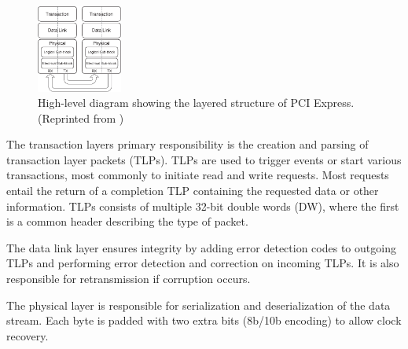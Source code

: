 \begin{figure}[!ht]
    \centering
    \includegraphics[width=0.25\textwidth]{figures/pcie}
    \caption{High-level diagram showing the layered structure of PCI Express. (Reprinted from \cite{pcie})}
    \label{fig:pcie}
\end{figure}

The transaction layers primary responsibility is the creation and parsing of transaction layer packets (TLPs).
TLPs are used to trigger events or start various transactions, most commonly to initiate read and write requests\footnotemark.
Most requests entail the return of a completion TLP containing the requested data or other information.
TLPs consists of multiple 32-bit double words (DW), where the first is a common header describing the type of packet.

The data link layer ensures integrity by adding error detection codes to outgoing TLPs and performing error detection and correction on incoming TLPs.
It is also responsible for retransmission if corruption occurs.

The physical layer is responsible for serialization and deserialization of the data stream.
Each byte is padded with two extra bits (8b/10b encoding) to allow clock recovery.

